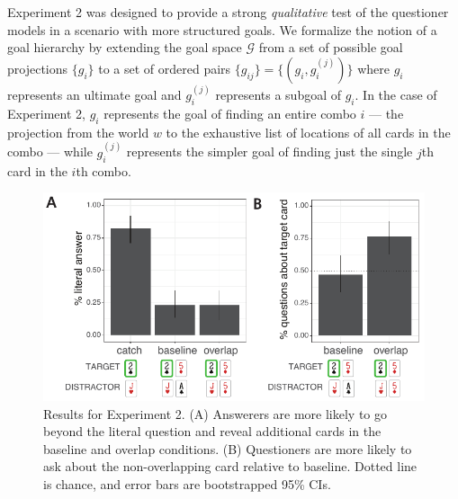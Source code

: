\documentclass[12pt, floatsintext, jou]{apa6}
\begin{document}
Experiment 2 was designed to provide a strong \emph{qualitative} test of the questioner models in a scenario with more structured goals.
We formalize the notion of a goal hierarchy by extending the goal space $\mathcal{G}$ from a set of possible goal projections $\{g_i\}$ to a set of ordered pairs $\{g_{ij}\} = \{(g_i, g_i^{(j)})\}$ where $g_i$ represents an ultimate goal and $g_i^{(j)}$ represents a subgoal of $g_i$. 
In the case of Experiment 2, $g_i$ represents the goal of finding an entire combo $i$ --- the projection from the world $w$ to the exhaustive list of locations of all cards in the combo --- while $g_i^{(j)}$ represents the simpler goal of finding just the single $j$th card in the $i$th combo. 


\begin{figure}[th!]
\begin{center}
\includegraphics[scale = 1]{Exp2/qualitativeResults.pdf}
\end{center}
\caption{Results for Experiment 2. (A) Answerers are more likely to go beyond the literal question and reveal additional cards in the baseline and overlap conditions. (B) Questioners are more likely to ask about the non-overlapping card relative to baseline. Dotted line is chance, and error bars are bootstrapped 95\% CIs.}
\label{fig:exp2results}
\end{figure}
\end{document}

